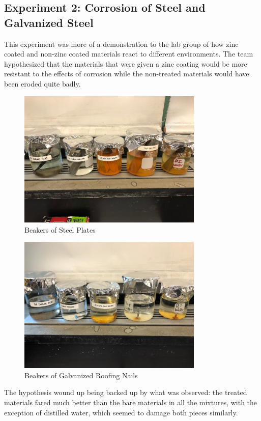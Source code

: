 \documentclass{article}
\begin{document}
{\subsection{Experiment 2: Corrosion of Steel and Galvanized Steel}
	This experiment was more of a demonstration to the lab group of how zinc coated and non-zinc coated materials react to different environments. The team hypothesized that the materials that were given a zinc coating would be more resistant to the effects of corrosion while the non-treated materials would have been eroded quite badly. 
    
\begin{figure}[ht]
\caption{Beakers of Steel Plates}
\centering
\includegraphics[width=250pt]{Beakers1.png}
\end{figure}

\begin{figure}[ht]
\caption{Beakers of Galvanized Roofing Nails}
\centering
\includegraphics[width=250pt]{Beakers2.png}
\end{figure}
\newpage

The hypothesis wound up being backed up by what was observed: the treated materials fared much better than the bare materials in all the mixtures, with the exception of distilled water, which seemed to damage both pieces similarly.

}
\end{document}
